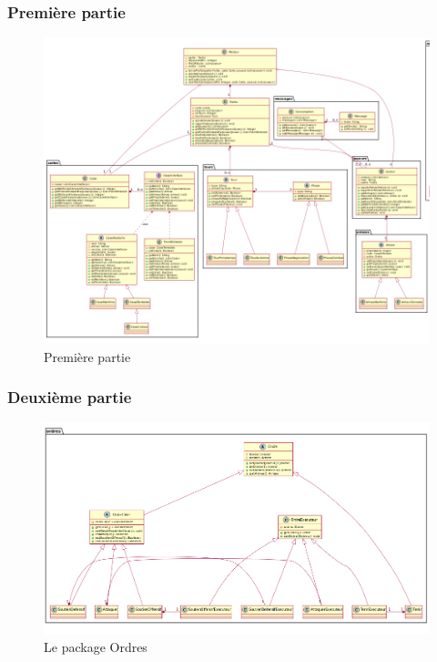 		\subsubsection{Première partie}
			\vspace{10mm}
			\begin{figure}[H]
				\centering
				\includegraphics[angle=90,width=150mm]{images/DP1.png}
				\caption{Première partie}
			\end{figure}


		\subsubsection{Deuxième partie}
			\vspace{10mm}
			\begin{figure}[H]
				\centering
				\includegraphics[scale=0.4]{images/DP2.png}
				\caption{Le package Ordres}
			\end{figure}

